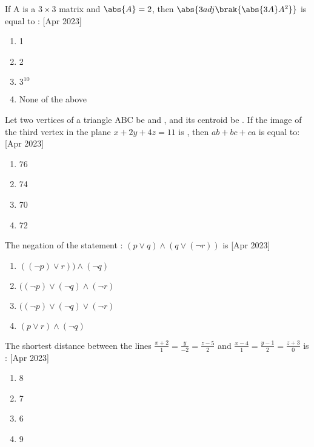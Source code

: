     \item If A is a $3\times 3$ matrix and $\abs{A}=2$, then $\abs{3adj\brak{\abs{3A}A^{2}}}$ is equal to :
     \hfill{[Apr 2023]}
		\begin{multicols}{1}
			\begin{enumerate}
				\item 1
    \item 2
    \item $3^{10}$
    \item None of the above
			\end{enumerate}
		\end{multicols}

    \item Let two vertices of a triangle ABC be  and , and its centroid be . If the image of the third vertex in the plane $x+2y+4z=11$ is , then $ab+bc+ca$ is equal to:
     \hfill{[Apr 2023]}
		\begin{multicols}{1}
			\begin{enumerate}
				
				\item 76
    \item 74
     \item 70
      \item 72
			\end{enumerate}
		\end{multicols}

    \item The negation of the statement : $(p \lor q) \land (q \lor (\neg r))$ is
     \hfill{[Apr 2023]}
    \begin{multicols}{1}
            \begin{enumerate}
              \item $((\neg p) \lor r)) \land (\neg q)$
              \item  $((\neg p) \lor (\neg q) \land(\neg r)$
              \item  $((\neg p) \lor (\neg q) \lor(\neg r)$
              \item $(p \lor r) \land  (\neg q)$
            \end{enumerate}
        \end{multicols}
    \item The shortest distance between the lines $\frac{x+2}{1}=\frac{y}{-2}=\frac{z-5}{2} $ and $\frac{x-4}{1}=\frac{y-1}{2}=\frac{z+3}{0}$ is :
     \hfill{[Apr 2023]}
    \begin{multicols}{1}
            \begin{enumerate}
              \item 8
              \item  7
              \item  6
              \item 9
            \end{enumerate}
        \end{multicols}


